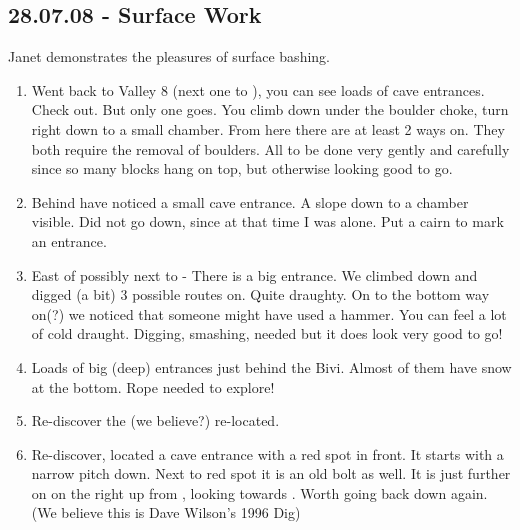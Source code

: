 \subsection{28.07.08 - Surface Work}

\begin{marginfigure}
\checkoddpage \ifoddpage \forcerectofloat \else \forceversofloat \fi
\centering
 \caption{Janet demonstrates the pleasures of surface bashing. }
 \label{janet relax}
\end{marginfigure}




\begin{enumerate}
\def\labelenumi{\arabic{enumi}.}
\item
  Went back to Valley 8 (next one to ), you can see loads of cave
  entrances. Check out. But only one goes. You climb down under the
  boulder choke, turn right down to a small chamber. From here there are
  at least 2 ways on. They both require the removal of boulders. All to
  be done very gently and carefully since so many blocks hang on top,
  but otherwise looking good to go.
\item
  Behind  have noticed a small cave entrance. A slope down to a
  chamber visible. Did not go down, since at that time I was alone. Put
  a cairn to mark an entrance.
\item
  East of  possibly next to  - There is a big
  entrance. We climbed down and digged (a bit) 3 possible routes on.
  Quite draughty. On to the bottom way on(?) we noticed that someone
  might have used a hammer. You can feel a lot of cold draught. Digging,
  smashing, needed but it does look very good to go!
\item
  Loads of big (deep) entrances just behind the Bivi. Almost of them
  have snow at the bottom. Rope needed to explore!
\item
  Re-discover the  (we believe?) re-located.
\item
  Re-discover, located a cave entrance with a red spot in front. It
  starts with a narrow pitch down. Next to red spot it is an old bolt as
  well. It is just further on on the right up from ,
  looking towards . Worth going back down again. (We believe this
  is Dave Wilson's 1996 Dig)
\end{enumerate}

